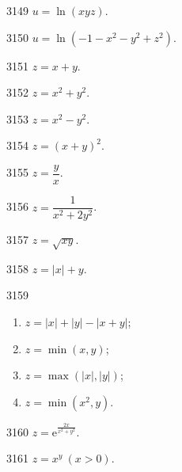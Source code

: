 \begin{prob}[S]{3149}
$u = \ln(xyz)$.
\end{prob}

\begin{prob}[S]{3150}
$u = \ln(-1 - x^2 - y^2 + z^2)$.
\end{prob}


\begin{prob}[S]{3151}
$z = x + y$.
\end{prob}

\begin{prob}[S]{3152}
$z = x^2 + y^2$.
\end{prob}

\begin{prob}[S]{3153}
$z = x^2 - y^2$.
\end{prob}

\begin{prob}[S]{3154}
$z = (x + y)^2$.
\end{prob}

\begin{prob}[S]{3155}
$z = \dfrac{y}{x}$.
\end{prob}

\begin{prob}[S]{3156}
$z = \dfrac{1}{x^2 + 2y^2}$.
\end{prob}

\begin{prob}[S]{3157}
$z = \sqrt{xy}$.
\end{prob}

\begin{prob}[S]{3158}
$z = |x| + y$.
\end{prob}

\begin{prob}[L]{3159}
\begin{enumerate}[label=(\alph*), itemsep=2pt, topsep=3pt]
\item $z = |x| + |y| - |x + y|$;
\item $z = \min(x, y)$;
\item $z = \max(|x|, |y|)$;
\item $z = \min(x^2, y)$.
\end{enumerate}
\end{prob}

\begin{prob}[S]{3160}
$z = \mathrm{e}^{\frac{2x}{x^2 + y^2}}$.
\end{prob}

\begin{prob}[S]{3161}
$z = x^y \ (x > 0)$.
\end{prob}

